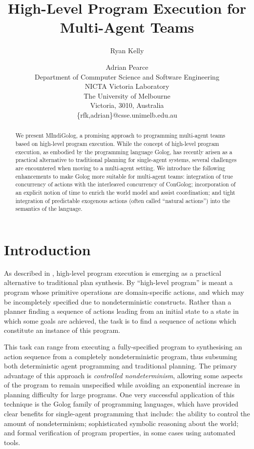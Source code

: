 \documentclass[letterpaper]{article}
\title{High-Level Program Execution for Multi-Agent Teams}
\author{Ryan Kelly \and Adrian Pearce \\
Department of Commputer Science and Software Engineering \\
NICTA Victoria Laboratory \\
The University of Melbourne \\
Victoria, 3010, Australia \\
\{rfk,adrian\}@csse.unimelb.edu.au}
\begin{document}
\maketitle

\begin{abstract}
We present MIndiGolog, a promising approach to programming multi-agent teams
based on high-level program execution. While the concept of high-level program
execution, as embodied by the programming language Golog, has recently arisen
as a practical
alternative to traditional planning for single-agent systems, several
challenges are encountered when moving to a multi-agent setting.  We introduce
the following enhancements to make Golog more suitable for multi-agent teams:
integration of true concurrency of actions with the interleaved concurrency
of ConGolog; incorporation of an explicit notion of time to enrich the world
model and assist coordination; and tight integration of predictable
exogenous actions (often called ``natural actions'') into the semantics of
the language.
\end{abstract}

\section{Introduction}

As described in \cite{giacomo99indigolog}, high-level program execution
is emerging as a practical alternative to traditional plan
synthesis. By ``high-level program'' is meant a program whose
primitive operations are domain-specific actions, and which may be
incompletely specified due to nondeterministic constructs. Rather
than a planner finding a sequence of actions leading from an initial
state to a state in which some goals are achieved, the task is to
find a sequence of actions which constitute an instance of this program.

This task can range from executing a fully-specified program to synthesising
an action sequence from a completely nondeterministic program, thus
subsuming both deterministic agent programming and traditional planning.
The primary advantage of this approach is \emph{controlled nondeterminism},
allowing some aspects of the program to remain unspecified while avoiding
an exponential increase in planning difficulty for large programs.
One very successful application of this technique is the Golog \cite{levesque97golog}
family of programming languages, which have provided clear benefits
for single-agent programming that include: the ability to control
the amount of nondeterminism; sophisticated symbolic reasoning about
the world; and formal verification of program properties, in some
cases using automated tools.
\end{document}
